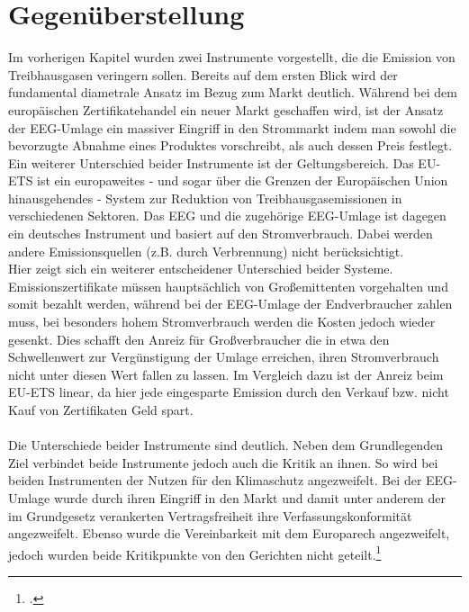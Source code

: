 \chapter{Gegenüberstellung}
Im vorherigen Kapitel wurden zwei Instrumente vorgestellt, die die Emission von Treibhausgasen veringern sollen.
Bereits auf dem ersten Blick wird der fundamental diametrale Ansatz im Bezug zum Markt deutlich.
Während bei dem europäischen Zertifikatehandel ein neuer Markt geschaffen wird, ist der Ansatz der EEG-Umlage ein massiver Eingriff in den Strommarkt indem man sowohl die bevorzugte Abnahme eines Produktes vorschreibt, als auch dessen Preis festlegt.\\
Ein weiterer Unterschied beider Instrumente ist der Geltungsbereich. Das EU-ETS ist ein europaweites - und sogar über die Grenzen der Europäischen Union hinausgehendes - System zur Reduktion von Treibhausgasemissionen in verschiedenen Sektoren. 
Das EEG und die zugehörige EEG-Umlage ist dagegen ein deutsches Instrument und basiert auf den Stromverbrauch. Dabei werden andere Emissionsquellen (z.B. durch Verbrennung) nicht berücksichtigt.\\
Hier zeigt sich ein weiterer entscheidener Unterschied beider Systeme.
Emissionszertifikate müssen hauptsächlich von Großemittenten vorgehalten und somit bezahlt werden, während bei der EEG-Umlage der Endverbraucher zahlen muss, bei besonders hohem Stromverbrauch werden die Kosten jedoch wieder gesenkt.
Dies schafft den Anreiz für Großverbraucher die in etwa den Schwellenwert zur Vergünstigung der Umlage erreichen, ihren Stromverbrauch nicht unter diesen Wert fallen zu lassen.
Im Vergleich dazu ist der Anreiz beim EU-ETS linear, da hier jede eingesparte Emission durch den Verkauf bzw. nicht Kauf von Zertifikaten Geld spart.\\\\
Die Unterschiede beider Instrumente sind deutlich. 
Neben dem Grundlegenden Ziel verbindet beide Instrumente jedoch auch die Kritik an ihnen.
So wird bei beiden Instrumenten der Nutzen für den Klimaschutz angezweifelt.
Bei der EEG-Umlage wurde durch ihren Eingriff in den Markt und damit unter anderem der im Grundgesetz verankerten Vertragsfreiheit ihre Verfassungskonformität angezweifelt. Ebenso wurde die Vereinbarkeit mit dem Europarech angezweifelt, jedoch wurden beide Kritikpunkte von den Gerichten nicht geteilt.\footcite[Vgl.][]{Bundesverfassungsgericht2016}
